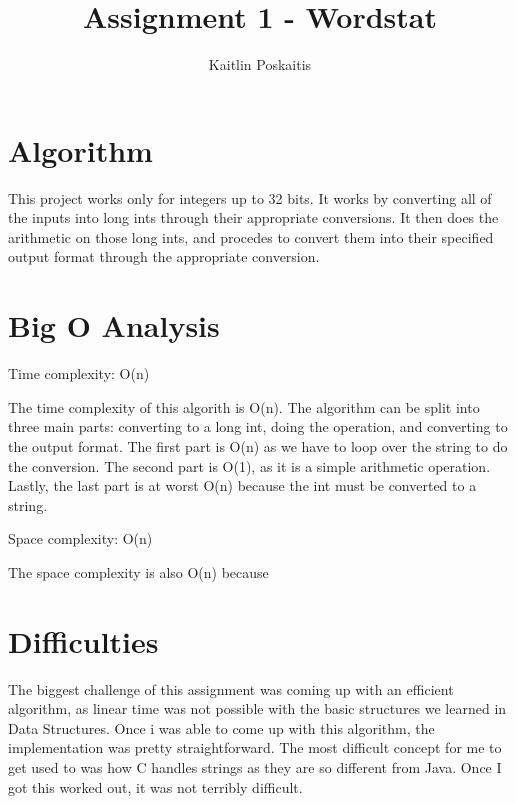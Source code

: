 \documentclass[11pt]{article}
\title{\bf Assignment 1 - Wordstat}
\author{Kaitlin Poskaitis}
\date{}
\begin{document}
\maketitle

\section*{Algorithm}

This project works only for integers up to 32 bits. It works by converting all 
of the inputs into long ints through their appropriate conversions. It then does
the arithmetic on those long ints, and procedes to convert them into their 
specified output format through the appropriate conversion. 

\section*{Big O Analysis}

Time complexity: O(n)

The time complexity of this algorith is O(n). The algorithm can be split into 
three main parts: converting to a long int, doing the operation, and converting 
to the output format. The first part is O(n) as we have to loop over the string
to do the conversion. The second part is O(1), as it is a simple arithmetic 
operation. Lastly, the last part is at worst O(n) because the int must be 
converted to a string.

Space complexity: O(n)

The space complexity is also O(n) because 

\section*{Difficulties}

The biggest challenge of this assignment was coming up with an efficient
algorithm, as linear time was not possible with the basic structures we learned
in Data Structures. Once i was able to come up with this algorithm, the 
implementation was pretty straightforward. The most difficult concept for me to
get used to was how C handles strings as they are so different from Java. Once
I got this worked out, it was not terribly difficult.
\end{document}
